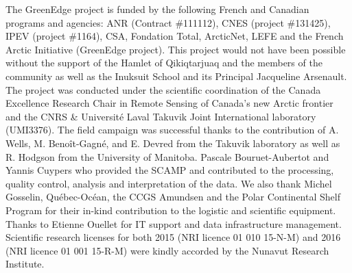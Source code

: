 \documentclass[essd, manuscript]{copernicus}
\begin{document}
\begin{acknowledgements}
    The GreenEdge project is funded by the following French and Canadian programs and agencies: ANR (Contract \#111112), CNES (project \#131425), IPEV (project \#1164), CSA, Fondation Total, ArcticNet, LEFE and the French Arctic Initiative (GreenEdge project). This project would not have been possible without the support of the Hamlet of Qikiqtarjuaq and the members of the community as well as the Inuksuit School and its Principal Jacqueline Arsenault. The project was conducted under the scientific coordination of the Canada Excellence Research Chair in Remote Sensing of Canada's new Arctic frontier and the CNRS \& Université Laval Takuvik Joint International laboratory (UMI3376). The field campaign was successful thanks to the contribution of A. Wells, M. Benoît-Gagné, and E. Devred from the Takuvik laboratory as well as R. Hodgson from the University of Manitoba. Pascale Bouruet-Aubertot and Yannis Cuypers who provided the SCAMP and contributed to the processing, quality control, analysis and interpretation of the data. We also thank Michel Gosselin, Québec-Océan, the CCGS Amundsen and the Polar Continental Shelf Program for their in-kind contribution to the logistic and scientific equipment. Thanks to Etienne Ouellet for IT support and data infrastructure management. Scientific research licenses for both 2015 (NRI licence 01 010 15-N-M) and 2016 (NRI licence 01 001 15-R-M) were kindly accorded by the Nunavut Research Institute.
\end{acknowledgements}






\end{document}
